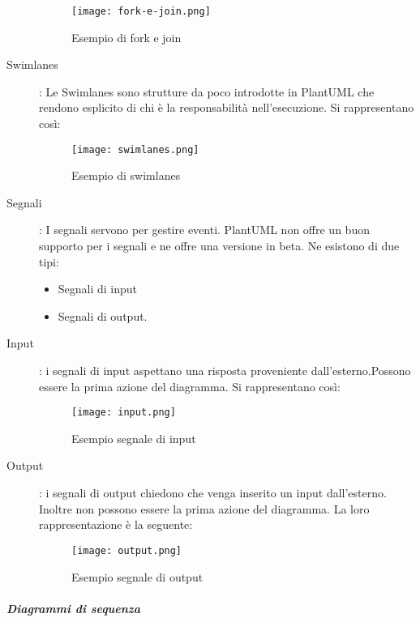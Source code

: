 \documentclass[../../norme-di-progetto.tex]{subfiles}
\begin{document}
\begin{description}
    \begin{figure}[H]%
      \label{fig:fork_e_join}
      \texttt{[image: fork-e-join.png]}
      \centering
      \caption{Esempio di fork e join}
    \end{figure}
    \item[Swimlanes]: Le Swimlanes sono strutture da poco introdotte in PlantUML che rendono esplicito di chi è la responsabilità nell'esecuzione. Si rappresentano così:
   \begin{figure}[H]%
      \label{fig:swimlanes}
      \texttt{[image: swimlanes.png]}
      \centering
      \caption{Esempio di swimlanes}
    \end{figure}
   \item[Segnali]: I segnali servono per gestire eventi. PlantUML non offre un buon supporto per i segnali e ne offre una versione in beta. Ne esistono di due tipi:
   \begin{itemize}
    \item Segnali di input
    \item Segnali di output.
   \end{itemize}
   \item [Input]: i segnali di input aspettano una risposta proveniente dall'esterno.Possono essere la prima azione del diagramma. Si rappresentano così:
   \begin{figure}[H]%
      \label{fig:input}
      \texttt{[image: input.png]}
      \centering
      \caption{Esempio segnale di input}
    \end{figure}
   \item [Output]: i segnali di output chiedono che venga inserito un input dall'esterno. Inoltre non possono essere la prima azione del diagramma. La loro rappresentazione è la seguente:
   \begin{figure}[H]%
    \label{fig:segnale_di_output}
    \texttt{[image: output.png]}
    \centering
    \caption{Esempio segnale di output}
  \end{figure}
\end{description}
\subparagraph{Diagrammi di sequenza}%
\label{subp:diagrammi_di_sequenza}
\end{document}
